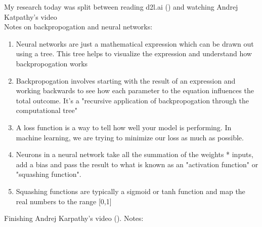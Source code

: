 \documentclass[a4paper, 11pt, oneside]{researchjournal} %
\author{Shad Boswell\\ %
University of Utah}
\begin{document}
 My research today was split between reading d2l.ai (\cite{d2l.ai}) and watching Andrej Katpathy's video \cite{AndrejKarpathyMicrogradVideo}
\\

Notes on backpropogation and neural networks: 
\begin{enumerate}
    \item Neural networks are just a mathematical expression which can be drawn out using a tree. This tree helps to visualize the expression and understand how backpropogation works
    \item Backpropogation involves starting with the result of an expression and working backwards to see how each parameter to the equation influences the total outcome. It's a "recursive application of backpropogation through the computational tree"
    \item A loss function is a way to tell how well your model is performing. In machine learning, we are trying to minimize our loss as much as possible.
    \item Neurons in a neural network take all the summation of the weights * inputs, add a bias and pass the result to what is known as an "activation function" or "squashing function". 
    \item Squashing functions are typically a sigmoid or tanh function and map the real numbers to the range [0,1]
    
\end{enumerate}
    


Finishing Andrej Karpathy's video 
(\cite{AndrejKarpathyMicrogradVideo}). Notes: 
\\
\end{document}

